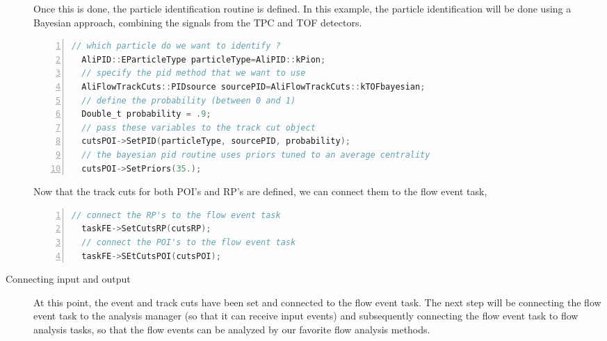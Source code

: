 \documentclass[a4paper]{book}
\numberwithin{equation}{subsection}
\begin{document}
\begin{description}
Once this is done, the particle identification routine is defined. In this example, the particle identification will be done using a Bayesian approach, combining the signals from the TPC and TOF detectors. 
\begin{lstlisting}[language=C, numbers=left]
  // which particle do we want to identify ?
  AliPID::EParticleType particleType=AliPID::kPion;
  // specify the pid method that we want to use  
  AliFlowTrackCuts::PIDsource sourcePID=AliFlowTrackCuts::kTOFbayesian;
  // define the probability (between 0 and 1) 
  Double_t probability = .9;
  // pass these variables to the track cut object
  cutsPOI->SetPID(particleType, sourcePID, probability);
  // the bayesian pid routine uses priors tuned to an average centrality
  cutsPOI->SetPriors(35.);\end{lstlisting}
  
Now that the track cuts for both POI's and RP's are defined, we can connect them to the flow event task,
\begin{lstlisting}[language=C, numbers=left]
  // connect the RP's to the flow event task
  taskFE->SetCutsRP(cutsRP);
  // connect the POI's to the flow event task
  taskFE->SEtCutsPOI(cutsPOI);\end{lstlisting}
  
  \item [Connecting input and output]
  At this point, the event and track cuts have been set and connected to the flow event task. The next step will be connecting the flow event task to the analysis manager (so that it can receive input events) and subsequently connecting the flow event task to flow analysis tasks, so that the flow events can be analyzed by our favorite flow analysis methods. 
  

\end{description}
\end{document}
